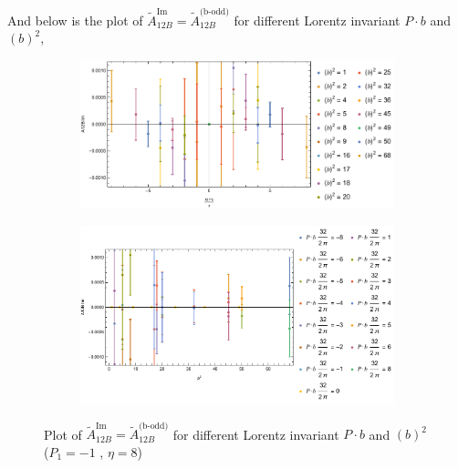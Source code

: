 \documentclass[]{article}
\numberwithin{equation}{section}
\newcommand{\tAmp}{\widetilde{A}}
\newcommand{\tAmp}{\ensuremath{\widetilde{A}^{(+)}}}
\begin{document}
And below is the plot of $\tAmp^{\text{Im}}_{12B}=\tAmp^{\text{(b-odd)}}_{12B}$ for different Lorentz invariant $P\cdot b$ and $(b)^2$,
\begin{figure}[h!]
     \centering
     \begin{subfigure}[b]{0.45\textwidth}
         \centering
         \includegraphics[width=\textwidth]{bP_A12B_b_odd_P1_-1_eta_8.pdf}
     \end{subfigure}
     \begin{subfigure}[b]{0.45\textwidth}
         \centering
         \includegraphics[width=\textwidth]{bsq_A12B_b_odd_P1_-1_eta_8.pdf}
     \end{subfigure}
        \caption{Plot of $\tAmp^{\text{Im}}_{12B}=\tAmp^{\text{(b-odd)}}_{12B}$ for different Lorentz invariant $P\cdot b$ and $(b)^2$  ($P_{1} = -1$ , $\eta=8$)}
\end{figure}
\end{document}
